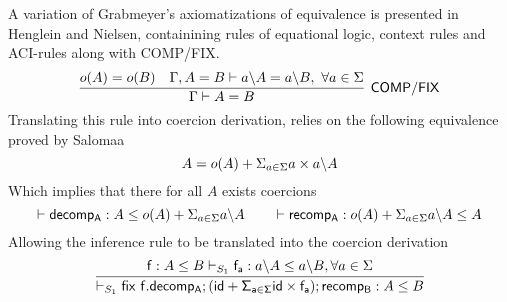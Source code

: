 \begin{example}[Grabmeyer]
A variation of Grabmeyer's axiomatizations of equivalence is presented in Henglein and Nielsen, containining rules of equational logic, context rules and ACI-rules along with COMP/FIX.
\[\infer[\mathsf{COMP/FIX}]{\Gamma \vdash A =  B}{\myo{A} =  \myo{B} & \Gamma, A = B \vdash \derive{a}{A} = \derive{a}{B},~\forall a \in \Sigma}\] 
Translating this rule into coercion derivation, relies on the following equivalence proved by Salomaa
\[ A = o(A) + \Sigma_{a \in \Sigma} a\times a \backslash A\]
Which implies that there for all $A$ exists coercions
\[\vdash \mathsf{decomp_A} : A \leq o(A) + \Sigma_{a \in \Sigma} a \backslash A \qquad \vdash \mathsf{recomp_A} : o(A) + \Sigma_{a \in \Sigma} a \backslash A \leq A\]
Allowing the inference rule to be translated into the coercion derivation
\[\infer{\containsP{}{\fix ~f.decomp_A;(id + \Sigma_{a \in \Sigma} id\times f_a); recomp_B}{A}{B}{S_1}}{\containsP{\dslcom{f} : A \leq B}{f_a}{\derive{a}{A}}{\derive{a}{B}}{S_1}, \forall a \in \Sigma} \]

\end{example}
